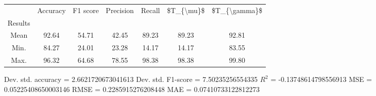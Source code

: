 \begin{tabular}{|c|c|c|c|c|c|c|}
\toprule
{} &  Accuracy &  F1 score &  Precision &  Recall &  \$T\_\{\textbackslash mu\}\$ &  \$T\_\{\textbackslash gamma\}\$ \\
Results &           &           &            &         &            &               \\
\hline
Mean    &     92.64 &     54.71 &      42.45 &   89.23 &      89.23 &         92.81 \\
Min.    &     84.27 &     24.01 &      23.28 &   14.17 &      14.17 &         83.55 \\
Max.    &     96.32 &     64.68 &      78.55 &   98.38 &      98.38 &         99.80 \\
\bottomrule
\end{tabular}

 Dev. std. accuracy = 2.6621720673041613
 Dev. std. F1-score = 7.50235256554335
 $R^2$ = -0.13748614798556913
 MSE = 0.05225408650003146
 RMSE = 0.2285915276208448
 MAE = 0.07410733122812273